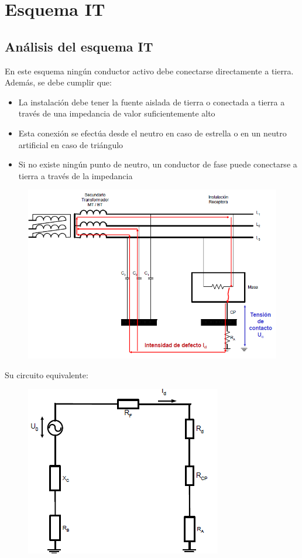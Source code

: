\chapter{Esquema IT}
\section{Análisis del esquema IT}
En este esquema ningún conductor activo debe conectarse directamente a tierra. Además, se debe cumplir que:
\begin{itemize}
	\item La instalación debe tener la fuente
	aislada de tierra o conectada a
	tierra a través de una impedancia
	de valor suficientemente alto
	\item Esta conexión se efectúa desde el
	neutro en caso de estrella o en un
	neutro artificial en caso de triángulo
	\item Si no existe ningún punto de neutro, un
	conductor de fase puede conectarse a
	tierra a través de la impedancia
\end{itemize}
\begin{figure}[H]
	\centering
	\includegraphics[width=0.7\linewidth]{Images/33}
	\label{fig:33}
\end{figure}

Su circuito equivalente:
\begin{figure}[H]
	\centering
	\includegraphics[width=0.4\linewidth]{Images/34}
	\label{fig:34}
\end{figure}

